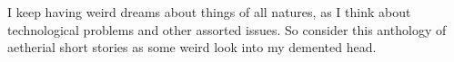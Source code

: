 I keep having weird dreams about things of all natures, as I think about technological problems and other assorted issues.  So consider this anthology of aetherial short stories as some weird look into my demented head.
